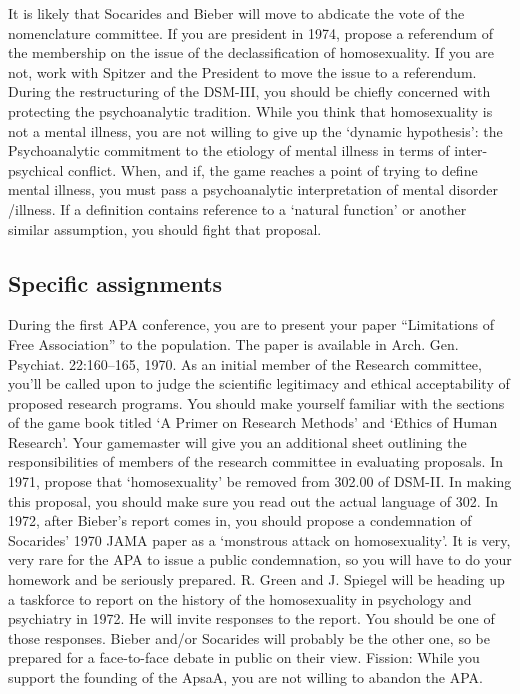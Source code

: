 It is likely that Socarides and Bieber will move to abdicate the vote of the nomenclature committee. If you are president in 1974, propose a referendum of the membership on the issue of the declassification of homosexuality. If you are not, work with Spitzer and the President to move the issue to a referendum.
During the restructuring of the DSM-III, you should be chiefly concerned with protecting the psychoanalytic tradition. While you think that homosexuality is not a mental illness, you are not willing to give up the `dynamic hypothesis': the Psychoanalytic commitment to the etiology of mental illness in terms of inter-psychical conflict.
When, and if, the game reaches a point of trying to define mental illness, you must pass a psychoanalytic interpretation of mental disorder \slash  illness. If a definition contains reference to a `natural function' or another similar assumption, you should fight that proposal.

\subsection{Specific assignments}
\label{specificassignments}

During the first APA conference, you are to present your paper “Limitations of Free Association” to the population. The paper is available in Arch. Gen. Psychiat. 22:160--165, 1970.
As an initial member of the Research committee, you'll be called upon to judge the scientific legitimacy and ethical acceptability of proposed research programs. You should make yourself familiar with the sections of the game book titled `A Primer on Research Methods' and `Ethics of Human Research'. Your gamemaster will give you an additional sheet outlining the responsibilities of members of the research committee in evaluating proposals.
In 1971, propose that `homosexuality' be removed from 302.00 of DSM-II. In making this proposal, you should make sure you read out the actual language of 302.
In 1972, after Bieber's report comes in, you should propose a condemnation of Socarides' 1970 JAMA paper as a `monstrous attack on homosexuality'. It is very, very rare for the APA to issue a public condemnation, so you will have to do your homework and be seriously prepared.
R. Green and J. Spiegel will be heading up a taskforce to report on the history of the homosexuality in psychology and psychiatry in 1972. He will invite responses to the report. You should be one of those responses. Bieber and\slash or Socarides will probably be the other one, so be prepared for a face-to-face debate in public on their view.
Fission: While you support the founding of the ApsaA, you are not willing to abandon the APA.

